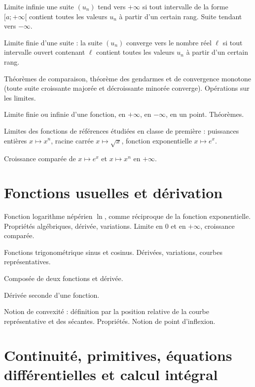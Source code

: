 \documentclass[a4paper,french,bookmarks]{book}
\begin{document}
    \begin{enumerate}
        \ithand Limite infinie une suite $(u_n)$ tend vers $+\infty$ si tout intervalle de la forme $[a ; +\infty[$ contient toutes les valeurs $u_n$ à partir d'un certain rang. Suite tendant vers $-\infty$.
        
        \ithand Limite finie d'une suite : la suite $(u_n)$ converge vers le nombre réel $\ell$ si tout intervalle ouvert contenant $\ell$ contient toutes les valeurs $u_n$ à partir d'un certain rang.
        
        \ithand Théorèmes de comparaison, théorème des gendarmes et de convergence monotone (toute suite croissante majorée et décroissante minorée converge). Opérations sur les limites.
        
        \ithand Limite finie ou infinie d'une fonction, en $+\infty$, en $-\infty$, en un point. Théorèmes.
        
        \ithand Limites des fonctions de références étudiées en classe de première : puissances entières $x \mapsto x^n$, racine carrée $x \mapsto \sqrt{x}$, fonction exponentielle $x \mapsto e^x$.
        
        \ithand Croissance comparée de $x \mapsto e^x$ et $x \mapsto x^n$ en $+\infty$.
    \end{enumerate}
    
    \section*{Fonctions usuelles et dérivation}
    
    \begin{enumerate}
        \ithand Fonction logarithme népérien $\ln$, comme réciproque de la fonction exponentielle. Propriétés algébriques, dérivée, variations. Limite en $0$ et en $+\infty$, croissance comparée.
        
        \ithand Fonctions trigonométrique sinus et cosinus. Dérivées, variations, courbes représentatives.
        
        \ithand Composée de deux fonctions et dérivée.
        
        \ithand Dérivée seconde d'une fonction.
        
        \ithand Notion de convexité : définition par la position relative de la courbe représentative et des sécantes. Propriétés. Notion de point d'inflexion.
    \end{enumerate}
    
    \section*{Continuité, primitives, équations différentielles et calcul intégral}
    
\end{document}
